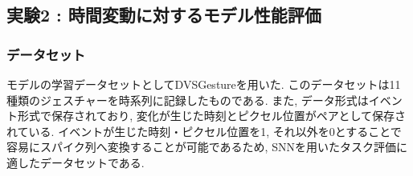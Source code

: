 \makeatletter %
\subsection{実験2 : 時間変動に対するモデル性能評価}

\subsubsection{データセット}
モデルの学習データセットとしてDVSGesture\cite{dvsgesture}を用いた.
このデータセットは11種類のジェスチャーを時系列に記録したものである.
また, データ形式はイベント形式で保存されており, 変化が生じた時刻とピクセル位置がペアとして保存されている.
イベントが生じた時刻・ピクセル位置を1, それ以外を0とすることで容易にスパイク列へ変換することが可能であるため, SNNを用いたタスク評価に適したデータセットである\cite{9207109}.


